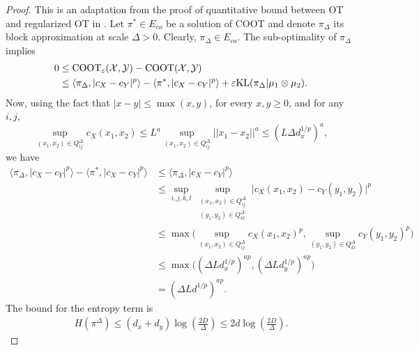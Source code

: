 \begin{proof}
    This is an adaptation from the proof of quantitative bound between OT and regularized OT in \citep{Genevay19}.
    Let $\pi^* \in E_{co}$ be a solution of COOT and denote $\pi_{\Delta}$ its block approximation at scale $\Delta > 0$.
    Clearly, $\pi_{\Delta} \in E_{co}$. The sub-optimality of $\pi_{\Delta}$ implies
    \begin{equation}
      \begin{split}
        0 &\leq \text{COOT}_{\varepsilon}(\mathcal X, \mathcal Y) - \text{COOT}(\mathcal X, \mathcal Y) \\
        &\leq \langle \pi_{\Delta}, \vert c_X - c_Y \vert^p \rangle - \langle \pi^*, \vert c_X - c_Y \vert^p \rangle +
        \varepsilon \text{KL}(\pi_{\Delta} \vert \mu_1 \otimes \mu_2).
      \end{split}
    \end{equation}
    Now, using the fact that $\vert x - y \vert \leq \max(x,y)$, for every $x, y \geq 0$, and for any $i,j$,
    \begin{equation}
      \sup_{(x_1, x_2) \in Q^{\Delta}_{ij}} c_X(x_1,x_2) \leq
      L^a \sup_{(x_1, x_2) \in Q^{\Delta}_{ij}} \vert\vert x_1 - x_2 \vert\vert^a \leq (L \Delta d_x^{1/p})^a,
    \end{equation}
    we have
    \begin{equation}
      \begin{split}
        \langle \pi_{\Delta}, \vert c_X - c_Y \vert^p \rangle - \langle \pi^*, \vert c_X - c_Y \vert^p \rangle
        &\leq \langle \pi_{\Delta}, \vert c_X - c_Y \vert^p \rangle \\
        &\leq \sup_{i,j,k,l} \sup_{\substack{(x_1, x_2) \in Q^{\Delta}_{ij} \\ (y_1,y_2) \in Q^{\Delta}_{kl}}}
        \vert c_X(x_1,x_2) - c_Y(y_1,y_2) \vert^p \\
        &\leq \max\big( \sup_{(x_1, x_2) \in Q^{\Delta}_{ij}} c_X(x_1,x_2)^p,
        \sup_{(y_1, y_2) \in Q^{\Delta}_{kl}} c_Y(y_1,y_2)^p \big) \\
        &\leq \max\big( (\Delta Ld_x^{1/p})^{ap}, (\Delta Ld_y^{1/p})^{ap} \big) \\
        &= (\Delta Ld^{1/p})^{ap}.
      \end{split}
    \end{equation}
    The bound for the entropy term is
    \begin{equation}
      \begin{split}
        H(\pi^{\Delta}) \leq (d_x + d_y) \log(\frac{2D}{\Delta}) \leq 2 d \log(\frac{2D}{\Delta}).

\end{split}
\end{equation}
\end{proof}
